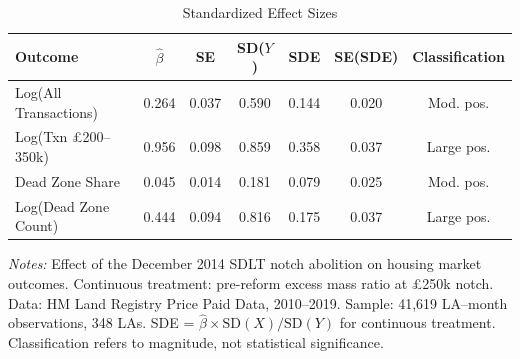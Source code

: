 \begin{table}[htbp]
\centering
\caption{Standardized Effect Sizes}
\label{tab:sde}
\small
\begin{tabular}{lcccccc}
\hline\hline
Outcome & $\hat{\beta}$ & SE & SD($Y$) & SDE & SE(SDE) & Classification \\
\hline
Log(All Transactions) & 0.264 & 0.037 & 0.590 & 0.144 & 0.020 & Mod. pos. \\
Log(Txn \pounds200--350k) & 0.956 & 0.098 & 0.859 & 0.358 & 0.037 & Large pos. \\
Dead Zone Share & 0.045 & 0.014 & 0.181 & 0.079 & 0.025 & Mod. pos. \\
Log(Dead Zone Count) & 0.444 & 0.094 & 0.816 & 0.175 & 0.037 & Large pos. \\
\hline\hline
\end{tabular}
\begin{minipage}{0.95\textwidth}\vspace{0.3em}
\footnotesize\textit{Notes:} Effect of the December 2014 SDLT notch abolition on housing market outcomes. Continuous treatment: pre-reform excess mass ratio at \pounds250k notch. Data: HM Land Registry Price Paid Data, 2010--2019. Sample: 41,619 LA--month observations, 348 LAs. SDE = $\hat{\beta} \times \text{SD}(X) / \text{SD}(Y)$ for continuous treatment. Classification refers to magnitude, not statistical significance.
\end{minipage}
\end{table}

